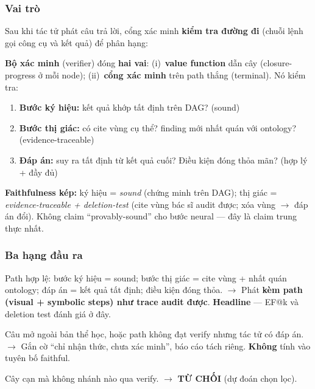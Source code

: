 \documentclass[11pt,a4paper]{article}
\begin{document}
\subsubsection{Vai trò}
Sau khi tác tử phát câu trả lời, cổng xác minh \textbf{kiểm tra đường đi} (chuỗi lệnh gọi công cụ và kết quả) để phân hạng:

\begin{highlightbox}
\textbf{Bộ xác minh} (verifier) đóng \textbf{hai vai}: (i)~\textbf{value function} dẫn cây (closure-progress ở mỗi node); (ii)~\textbf{cổng xác minh} trên path thắng (terminal). Nó kiểm tra:
\begin{enumerate}[leftmargin=0.5em]
  \item \textbf{Bước ký hiệu:} kết quả khớp tất định trên DAG? (sound)
  \item \textbf{Bước thị giác:} có cite vùng cụ thể? finding mới nhất quán với ontology? (evidence-traceable)
  \item \textbf{Đáp án:} suy ra tất định từ kết quả cuối? Điều kiện đóng thỏa mãn? (hợp lý + đầy đủ)
\end{enumerate}
\end{highlightbox}

\textbf{Faithfulness kép:} ký hiệu = \emph{sound} (chứng minh trên DAG); thị giác = \emph{evidence-traceable + deletion-test} (cite vùng bác sĩ audit được; xóa vùng $\to$ đáp án đổi). Không claim ``provably-sound'' cho bước neural --- đây là claim trung thực nhất.

\subsubsection{Ba hạng đầu ra}

\begin{description}[leftmargin=1.5em, style=nextline]
  \item[Hạng A --- Trung thực (path qua verify-gate)]
  Path hợp lệ: bước ký hiệu = sound; bước thị giác = cite vùng + nhất quán ontology; đáp án = kết quả tất định; điều kiện đóng thỏa.
  $\to$ Phát \textbf{kèm path (visual + symbolic steps) như trace audit được}. \textbf{Headline} --- EF@k và deletion test đánh giá ở đây.

  \item[Hạng B --- Chưa xác minh]
  Câu mở ngoài bản thể học, hoặc path không đạt verify nhưng tác tử có đáp án.
  $\to$ Gắn cờ ``chỉ nhận thức, chưa xác minh'', báo cáo tách riêng. \textbf{Không} tính vào tuyên bố faithful.

  \item[Từ chối]
  Cây cạn mà không nhánh nào qua verify.
  $\to$ \textbf{TỪ CHỐI} (dự đoán chọn lọc).
\end{description}
\end{document}

